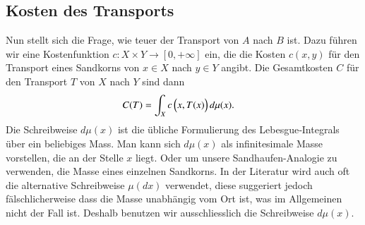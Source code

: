 \subsection{Kosten des Transports\label{mongekant:subsection:transport_cost}}
Nun stellt sich die Frage,
wie \glqq teuer\grqq{} der Transport von $A$ nach $B$ ist.
Dazu führen wir eine Kostenfunktion $c : X \times Y \to [0, +\infty]$ ein,
die die Kosten $c(x,y)$ für den Transport eines Sandkorns
von $x \in X$ nach $y \in Y$ angibt.
Die Gesamtkosten $C$ für den Transport $T$ von $X$ nach $Y$ sind dann
\begin{align}
C(T)
&=
\int_X c\,\Bigl(x, T(x)\Bigr) \, d\mu(x)
\label{mongekant:eq:monge_transport_cost}
.
\end{align}
Die Schreibweise $d\mu(x)$ ist die übliche Formulierung des
Lebesgue‑Integrals über ein beliebiges Mass.
Man kann sich $d\mu(x)$ als \glqq infinitesimale Masse\grqq{} vorstellen,
die an der Stelle $x$ liegt.
Oder um unsere Sandhaufen-Analogie zu verwenden,
die Masse eines einzelnen Sandkorns.
In der Literatur wird auch oft die alternative Schreibweise $\mu(dx)$ verwendet,
diese suggeriert jedoch fälschlicherweise dass die Masse unabhängig vom Ort ist,
was im Allgemeinen nicht der Fall ist.
Deshalb benutzen wir ausschliesslich die Schreibweise $d\mu(x)$.
